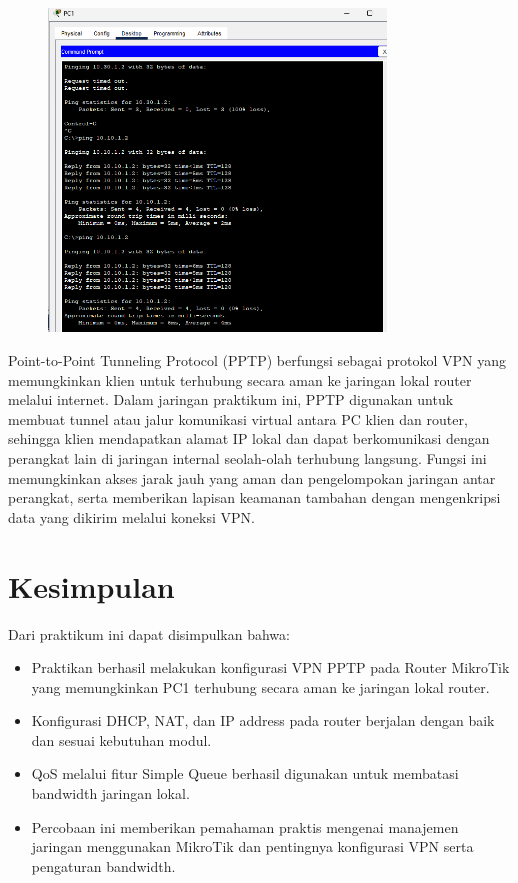 \begin{figure}[H]
\centering
\includegraphics[width=0.8\textwidth]{P1/img/Screenshot 2025-06-12 174545.png}
\end{figure}

Point-to-Point Tunneling Protocol (PPTP) berfungsi sebagai protokol VPN yang memungkinkan klien untuk terhubung secara aman ke jaringan lokal router melalui internet. Dalam jaringan praktikum ini, PPTP digunakan untuk membuat tunnel atau jalur komunikasi virtual antara PC klien dan router, sehingga klien mendapatkan alamat IP lokal dan dapat berkomunikasi dengan perangkat lain di jaringan internal seolah-olah terhubung langsung. Fungsi ini memungkinkan akses jarak jauh yang aman dan pengelompokan jaringan antar perangkat, serta memberikan lapisan keamanan tambahan dengan mengenkripsi data yang dikirim melalui koneksi VPN.


\section{Kesimpulan}
Dari praktikum ini dapat disimpulkan bahwa:

\begin{itemize}
    \item Praktikan berhasil melakukan konfigurasi VPN PPTP pada Router MikroTik yang memungkinkan PC1 terhubung secara aman ke jaringan lokal router.
    \item Konfigurasi DHCP, NAT, dan IP address pada router berjalan dengan baik dan sesuai kebutuhan modul.
    \item QoS melalui fitur Simple Queue berhasil digunakan untuk membatasi bandwidth jaringan lokal.
    \item Percobaan ini memberikan pemahaman praktis mengenai manajemen jaringan menggunakan MikroTik dan pentingnya konfigurasi VPN serta pengaturan bandwidth.
\end{itemize}
